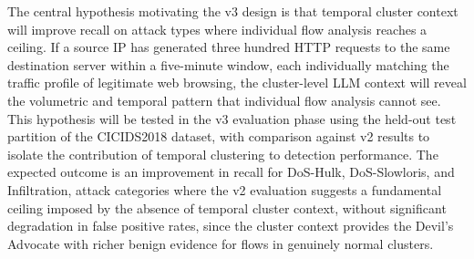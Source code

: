 \documentclass[../main.tex]{subfiles}
\begin{document}
The central hypothesis motivating the v3 design is that temporal cluster context will improve recall on attack types where individual flow analysis reaches a ceiling. If a source IP has generated three hundred HTTP requests to the same destination server within a five-minute window, each individually matching the traffic profile of legitimate web browsing, the cluster-level LLM context will reveal the volumetric and temporal pattern that individual flow analysis cannot see. This hypothesis will be tested in the v3 evaluation phase using the held-out test partition of the CICIDS2018 dataset, with comparison against v2 results to isolate the contribution of temporal clustering to detection performance. The expected outcome is an improvement in recall for DoS-Hulk, DoS-Slowloris, and Infiltration, attack categories where the v2 evaluation suggests a fundamental ceiling imposed by the absence of temporal cluster context, without significant degradation in false positive rates, since the cluster context provides the Devil's Advocate with richer benign evidence for flows in genuinely normal clusters.

\onlystandalone{\printbibliography}
\end{document}
